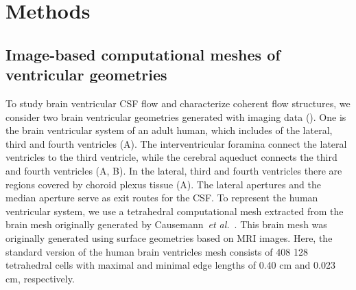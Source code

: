 \documentclass{template}
\begin{document}
\section{Methods}
\subsection{Image-based computational meshes of ventricular geometries}
To study brain ventricular CSF flow and characterize coherent flow structures,
we consider two brain ventricular geometries generated with imaging data
(). One is the brain ventricular system of an adult human,
which includes of the lateral, third and fourth ventricles (A).
The interventricular foramina connect the lateral ventricles to the third ventricle,
while the cerebral aqueduct connects the third and fourth ventricles (A, B).
In the lateral, third and fourth ventricles there are regions covered by choroid plexus tissue
(A). The lateral apertures and the median aperture serve as exit routes for the CSF.
To represent the human ventricular system, we use a tetrahedral computational mesh extracted
from the brain mesh originally generated by Causemann~\emph{et al.}~\citep{Causemann2022HumanFramework}.
This brain mesh was originally generated using surface geometries based on MRI images.
Here, the standard version of the human brain ventricles mesh consists of
408 128 tetrahedral cells with maximal and minimal edge lengths
of 0.40 cm and 0.023 cm, respectively.
\end{document}
